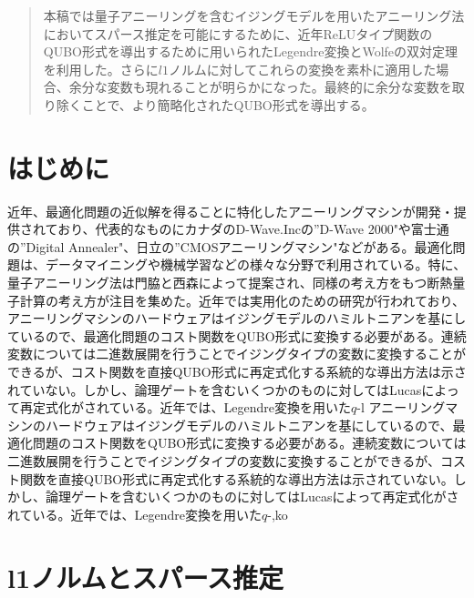 \documentclass[paper]{ieicej}
\begin{document}
\begin{abstract}
  本稿では量子アニーリングを含むイジングモデルを用いたアニーリング法においてスパース推定を可能にするために、近年ReLUタイプ関数のQUBO形式を導出するために用いられたLegendre変換とWolfeの双対定理を利用した。さらに$l1$ノルムに対してこれらの変換を素朴に適用した場合、余分な変数も現れることが明らかになった。最終的に余分な変数を取り除くことで、より簡略化されたQUBO形式を導出する。
\end{abstract}
\begin{keyword}
\end{keyword}
\begin{eabstract}
\end{eabstract}
\begin{ekeyword}
\end{ekeyword}
\maketitle

\section{はじめに}
近年、最適化問題の近似解を得ることに特化したアニーリングマシンが開発・提供されており、代表的なものにカナダのD-Wave.Incの''D-Wave 2000"や富士通の''Digital Annealer"、日立の''CMOSアニーリングマシン"などがある。最適化問題は、データマイニングや機械学習などの様々な分野で利用されている。特に、量子アニーリング法は門脇と西森によって提案され、同様の考え方をもつ断熱量子計算の考え方が注目を集めた。近年では実用化のための研究が行われており、
アニーリングマシンのハードウェアはイジングモデルのハミルトニアンを基にしているので、最適化問題のコスト関数をQUBO形式に変換する必要がある。連続変数については二進数展開を行うことでイジングタイプの変数に変換することができるが、コスト関数を直接QUBO形式に再定式化する系統的な導出方法は示されていない。しかし、論理ゲートを含むいくつかのものに対してはLucasによって再定式化がされている。近年では、Legendre変換を用いた$q$-l
アニーリングマシンのハードウェアはイジングモデルのハミルトニアンを基にしているので、最適化問題のコスト関数をQUBO形式に変換する必要がある。連続変数については二進数展開を行うことでイジングタイプの変数に変換することができるが、コスト関数を直接QUBO形式に再定式化する系統的な導出方法は示されていない。しかし、論理ゲートを含むいくつかのものに対してはLucasによって再定式化がされている。近年では、Legendre変換を用いた$q$-,ko

\section{l1ノルムとスパース推定}
\end{document}
